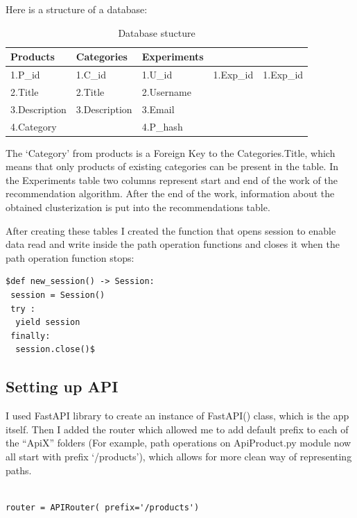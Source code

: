 \documentclass[twoside,twocolumn]{article}
\begin{document}
Here is a structure of a database:

\begin{table}[h]
\centering
\caption{Database stucture}
\begin{tabular}{lll}
\centering
Products & Categories & Experiments  \\
\hline \hline 
1.P_id & 1.C_id & 1.U_id & 1.Exp_id & 1.Exp_id \\
\hline 
2.Title & 2.Title & 2.Username  \\
\hline
3.Description & 3.Description & 3.Email  \\
\hline
4.Category & & 4.P_hash  \\
\hline
\end{tabular}
\end{table}

The ‘Category’ from products is a Foreign Key to the Categories.Title,
which means that only products of existing categories can be present in
the table. In the Experiments table two columns represent start and end
of the work of the recommendation algorithm. After the end of the work,
information about the obtained clusterization is put into the
recommendations table. 

After creating these tables I created the function that opens session to
enable data read and write inside the path operation functions and closes
it when the path operation function stops:


\begin{lstlisting}
$def new_session() -> Session:
 session = Session()
 try :
  yield session
 finally:
  session.close()$

\end{lstlisting}

\subsection{Setting up API}

I used FastAPI library to create an instance of FastAPI() class, which is
the app itself. Then I added the router which allowed me to add default
prefix to each of the “ApiX” folders (For example, path operations on
ApiProduct.py module now all start with prefix ‘/products’), which
allows for more clean way of representing paths. 

\begin{lstlisting}

router = APIRouter( prefix='/products')
\end{lstlisting}
\end{document}
